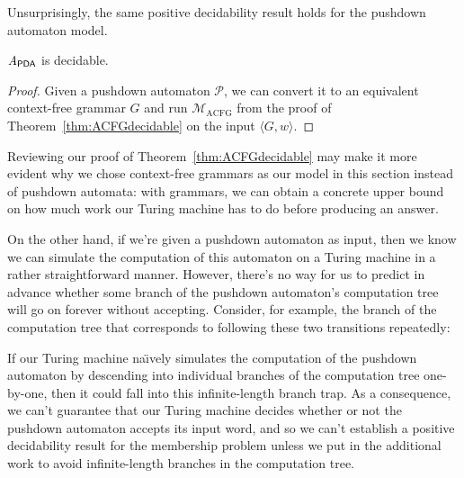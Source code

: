 Unsurprisingly, the same positive decidability result holds for the pushdown automaton model.

\begin{corollary}
$\mathit{A}_{\textsf{PDA}}$ is decidable.

\begin{proof}
Given a pushdown automaton $\mathcal{P}$, we can convert it to an equivalent context-free grammar $G$ and run $\mathcal{M}_{\mathrm{ACFG}}$ from the proof of Theorem~\ref{thm:ACFGdecidable} on the input $\langle G, w \rangle$.
\end{proof}
\end{corollary}

Reviewing our proof of Theorem~\ref{thm:ACFGdecidable} may make it more evident why we chose context-free grammars as our model in this section instead of pushdown automata: with grammars, we can obtain a concrete upper bound on how much work our Turing machine has to do before producing an answer.

On the other hand, if we're given a pushdown automaton as input, then we know we can simulate the computation of this automaton on a Turing machine in a rather straightforward manner. However, there's no way for us to predict in advance whether some branch of the pushdown automaton's computation tree will go on forever without accepting. Consider, for example, the branch of the computation tree that corresponds to following these two transitions repeatedly:
\begin{center}
\end{center}
If our Turing machine na\"{\i}vely simulates the computation of the pushdown automaton by descending into individual branches of the computation tree one-by-one, then it could fall into this infinite-length branch trap. As a consequence, we can't guarantee that our Turing machine decides whether or not the pushdown automaton accepts its input word, and so we can't establish a positive decidability result for the membership problem unless we put in the additional work to avoid infinite-length branches in the computation tree.

